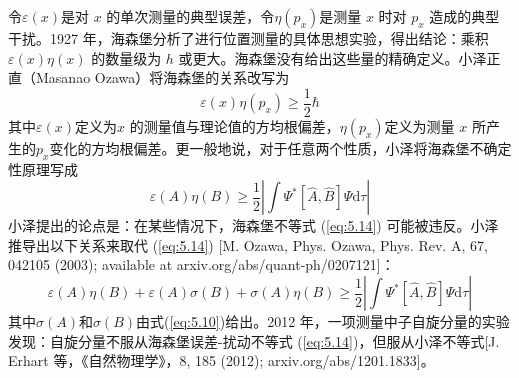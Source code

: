     令$\varepsilon\left(x\right)$是对 $x$ 的单次测量的典型误差，令$\eta \left(p_x\right)$是测量 $x$ 时对 $p_x$ 造成的典型干扰。1927 年，海森堡分析了进行位置测量的具体思想实验，得出结论：乘积 $\varepsilon\left(x\right)\eta\left(x\right)$ 的数量级为 $h$ 或更大。海森堡没有给出这些量的精确定义。小泽正直（Masanao Ozawa）将海森堡的关系改写为
    \begin{equation*}
        \varepsilon\left(x\right)\eta\left(p_x\right) \ge \frac{1}{2}\hbar
    \end{equation*}
    其中$\varepsilon\left(x\right)$定义为$x$ 的测量值与理论值的方均根偏差，$\eta\left(p_x\right)$定义为测量 $x$ 所产生的$p_x$变化的方均根偏差。更一般地说，对于任意两个性质，小泽将海森堡不确定性原理写成
    \begin{equation}
        \varepsilon\left(A\right)\eta\left(B\right) \ge \frac{1}{2}\left|\int \Psi^{\ast}\left[\hat{A},\hat{B}\right]\Psi\mathrm{d}\tau\right|
        \label{eq:5.14}
    \end{equation}
    小泽提出的论点是：在某些情况下，海森堡不等式 (\ref{eq:5.14}) 可能被违反。小泽推导出以下关系来取代 (\ref{eq:5.14}) [M. Ozawa, Phys. Ozawa, Phys. Rev. A, 67, 042105 (2003); available at arxiv.org/abs/quant-ph/0207121]：
    \begin{equation*}
        \varepsilon\left(A\right)\eta\left(B\right) + \varepsilon\left(A\right)\sigma\left(B\right) + \sigma\left(A\right)\eta\left(B\right) \ge \frac{1}{2}\left|\int \Psi^{\ast}\left[\hat{A},\hat{B}\right]\Psi\mathrm{d}\tau\right|
    \end{equation*}
    其中$\sigma\left(A\right)$和$\sigma\left(B\right)$由式(\ref{eq:5.10})给出。2012 年，一项测量中子自旋分量的实验发现：自旋分量不服从海森堡误差-扰动不等式 (\ref{eq:5.14})，但服从小泽不等式[J. Erhart 等，《自然物理学》，8, 185 (2012); arxiv.org/abs/1201.1833]。

